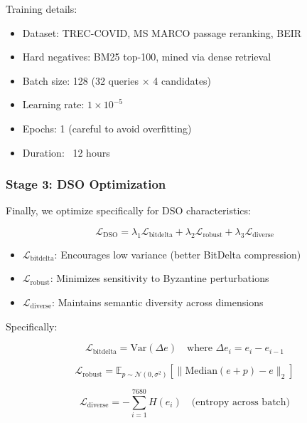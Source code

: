 \documentclass[11pt,letterpaper]{article}
\begin{document}
Training details:
\begin{itemize}
    \item Dataset: TREC-COVID, MS MARCO passage reranking, BEIR
    \item Hard negatives: BM25 top-100, mined via dense retrieval
    \item Batch size: 128 (32 queries × 4 candidates)
    \item Learning rate: $1 \times 10^{-5}$
    \item Epochs: 1 (careful to avoid overfitting)
    \item Duration: ~12 hours
\end{itemize}

\subsubsection{Stage 3: DSO Optimization}

Finally, we optimize specifically for DSO characteristics:

\begin{equation}
\mathcal{L}_{\text{DSO}} = \lambda_1 \mathcal{L}_{\text{bitdelta}} + \lambda_2 \mathcal{L}_{\text{robust}} + \lambda_3 \mathcal{L}_{\text{diverse}}
\end{equation}

\begin{itemize}
    \item $\mathcal{L}_{\text{bitdelta}}$: Encourages low variance (better BitDelta compression)
    \item $\mathcal{L}_{\text{robust}}$: Minimizes sensitivity to Byzantine perturbations
    \item $\mathcal{L}_{\text{diverse}}$: Maintains semantic diversity across dimensions
\end{itemize}

Specifically:

\begin{equation}
\mathcal{L}_{\text{bitdelta}} = \text{Var}(\Delta e) \quad \text{where } \Delta e_i = e_i - e_{i-1}
\end{equation}

\begin{equation}
\mathcal{L}_{\text{robust}} = \mathbb{E}_{p \sim \mathcal{N}(0, \sigma^2)} \left[\|\text{Median}(e + p) - e\|_2\right]
\end{equation}

\begin{equation}
\mathcal{L}_{\text{diverse}} = -\sum_{i=1}^{7680} H(e_i) \quad \text{(entropy across batch)}
\end{equation}
\end{document}

